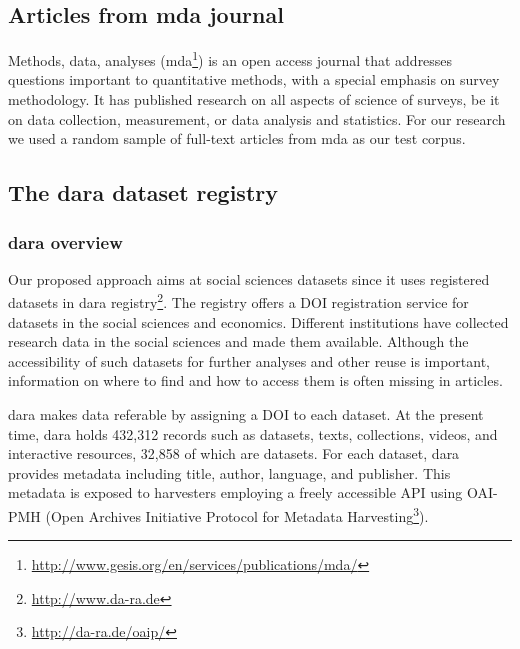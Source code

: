 \documentclass{IOS-Book-Article}
\newcommand{\dara}{\textsf{da\textbar ra}}
\begin{document}
 \subsection{Articles from mda journal}\label{sec:mda}
 
 Methods, data, analyses (mda\footnote{\url{http://www.gesis.org/en/services/publications/mda/}}) is an open access journal that addresses questions important to quantitative methods, with a special emphasis on survey methodology.
 It has published research on all aspects of science of surveys, be it on data collection, measurement, or data analysis and statistics.
 For our research we used a random sample of full-text articles from mda as our test corpus.
 
  \subsection{The {\dara} dataset registry}
  
  \subsubsection{{\dara} overview}
  Our proposed approach aims at social sciences datasets since it uses registered datasets in {\dara} registry\footnote{\url{http://www.da-ra.de}}.
  The registry offers a DOI registration service for datasets in the social sciences and economics. 
  Different institutions have collected research data in the social sciences and made them available.
  Although the accessibility of such datasets for further analyses and other reuse is important, information on where to find and how to access them is often missing in articles.
  
{\dara} makes 
data referable 
by assigning a DOI to each dataset.
At the present time, {\dara} holds 432,312 records such as datasets, texts, collections, videos, and interactive resources, 32,858 of which are datasets. 
For each dataset, {\dara} provides metadata including title, author, language, and publisher.
This metadata is exposed to harvesters employing a freely accessible API using OAI-PMH (Open Archives Initiative Protocol for Metadata Harvesting\footnote{\url{http://da-ra.de/oaip/}}). 
  
\end{document}
